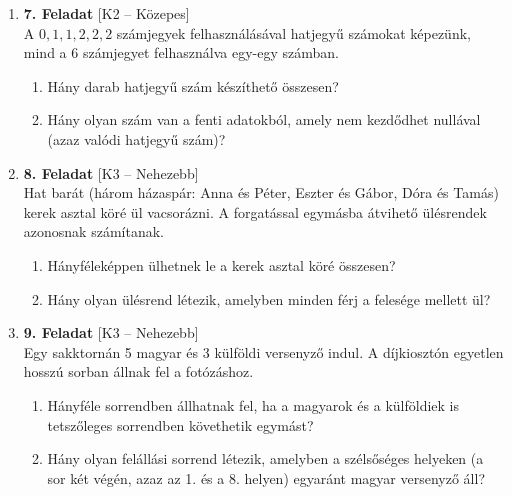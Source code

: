 \documentclass[12pt,a4paper]{article}
\begin{document}
\begin{enumerate}[label=\arabic*., leftmargin=*]
    \vspace{0.4cm}

    \item \textbf{7. Feladat} \textsf{\small [K2 – Közepes]} \\
    A $0, 1, 1, 2, 2, 2$ számjegyek felhasználásával hatjegyű számokat képezünk, mind a 6 számjegyet felhasználva egy-egy számban.
    \begin{enumerate}[label=\alph*)]
        \item Hány darab hatjegyű szám készíthető összesen?
        \item Hány olyan szám van a fenti adatokból, amely nem kezdődhet nullával (azaz valódi hatjegyű szám)?
    \end{enumerate}

    \vspace{0.4cm}

    \item \textbf{8. Feladat} \textsf{\small [K3 – Nehezebb]} \\
    Hat barát (három házaspár: Anna és Péter, Eszter és Gábor, Dóra és Tamás) kerek asztal köré ül vacsorázni. A forgatással egymásba átvihető ülésrendek azonosnak számítanak.
    \begin{enumerate}[label=\alph*)]
        \item Hányféleképpen ülhetnek le a kerek asztal köré összesen?
        \item Hány olyan ülésrend létezik, amelyben minden férj a felesége mellett ül?
    \end{enumerate}

    \vspace{0.4cm}

    \item \textbf{9. Feladat} \textsf{\small [K3 – Nehezebb]} \\
    Egy sakktornán 5 magyar és 3 külföldi versenyző indul. A díjkiosztón egyetlen hosszú sorban állnak fel a fotózáshoz.
    \begin{enumerate}[label=\alph*)]
        \item Hányféle sorrendben állhatnak fel, ha a magyarok és a külföldiek is tetszőleges sorrendben követhetik egymást?
        \item Hány olyan felállási sorrend létezik, amelyben a szélsőséges helyeken (a sor két végén, azaz az 1. és a 8. helyen) egyaránt magyar versenyző áll?
    \end{enumerate}

    \vspace{0.4cm}


\end{enumerate}
\end{document}
